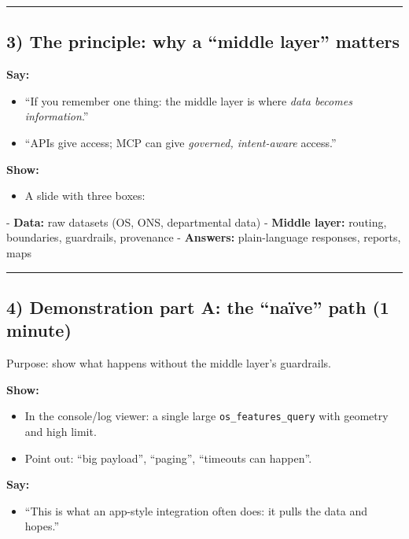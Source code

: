 \par\medskip\hrule\medskip

\subsection{3) The principle: why a “middle layer” matters}
\textbf{Say:}
\begin{itemize}[leftmargin=*]
\item “If you remember one thing: the middle layer is where \textit{data becomes information}.”
\item “APIs give access; MCP can give \textit{governed, intent-aware} access.” \cite{mcp_spec_2025_11_25,ncsc_secure_ai_guidelines,data_ai_ethics_framework}
\end{itemize}

\textbf{Show:}
\begin{itemize}[leftmargin=*]
\item A slide with three boxes:
\end{itemize}
  - \textbf{Data:} raw datasets (OS, ONS, departmental data)
  - \textbf{Middle layer:} routing, boundaries, guardrails, provenance
  - \textbf{Answers:} plain-language responses, reports, maps

\par\medskip\hrule\medskip

\subsection{4) Demonstration part A: the “naïve” path (1 minute)}
Purpose: show what happens without the middle layer’s guardrails.

\textbf{Show:}
\begin{itemize}[leftmargin=*]
\item In the console/log viewer: a single large \texttt{os\_features\_query} with geometry and high limit.
\item Point out: “big payload”, “paging”, “timeouts can happen”.
\end{itemize}

\textbf{Say:}
\begin{itemize}[leftmargin=*]
\item “This is what an app-style integration often does: it pulls the data and hopes.”
\end{itemize}

